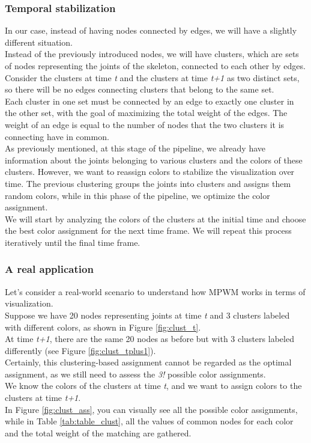 \subsubsection{Temporal stabilization}
In our case, instead of having nodes connected by edges, we will have a slightly different situation. \\   
Instead of the previously introduced nodes, we will have clusters, which are sets of nodes representing the joints of the skeleton, connected to each other by edges.
\\  
Consider the clusters at time \textit{t} and the clusters at time \textit{t+1} as two distinct sets, so there will be no edges connecting clusters that belong to the same set.\\
Each cluster in one set must be connected by an edge to exactly one cluster in the other set, with the goal of maximizing the total weight of the edges.
The weight of an edge is equal to the number of nodes that the two clusters it is connecting have in common.\\
As previously mentioned, at this stage of the pipeline, we already have information about the joints belonging to various clusters and the colors of these clusters. However, we want to reassign colors to stabilize the visualization over time.
The previous clustering groups the joints into clusters and assigns them random colors, while in this phase of the pipeline, we optimize the color assignment.\\
We will start by analyzing the colors of the clusters at the initial time and choose the best color assignment for the next time frame.
We will repeat this process iteratively until the final time frame.


\subsubsection{A real application}
Let's consider a real-world scenario to understand how MPWM works in terms of visualization. \\
Suppose we have 20 nodes representing joints at time \textit{t} and 3 clusters labeled with different colors, as shown in Figure \ref{fig:clust_t}. \\
At time \textit{t+1}, there are the same 20 nodes as before but with 3 clusters labeled differently (see Figure \ref{fig:clust_tplus1}).  \\
Certainly, this clustering-based assignment cannot be regarded as the optimal assignment, as we still need to assess the \textit{3!} possible color assignments. \\
We know the colors of the clusters at time \textit{t}, and we want to assign colors to the clusters at time \textit{t+1}. \\
In Figure \ref{fig:clust_ass}, you can visually see all the possible color assignments, while in Table \ref{tab:table_clust}, all the values of common nodes for each color and the total weight of the matching are gathered.



